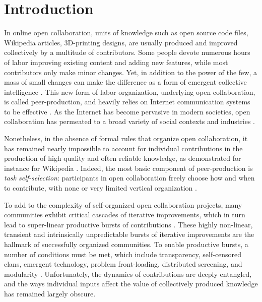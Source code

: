 \section{Introduction}
In online open collaboration, units of knowledge such as open source code files, Wikipedia articles,  3D-printing designs, are usually produced and improved collectively by a multitude of contributors. Some people devote numerous hours of labor improving existing content and adding new features, while most contributors only make minor changes. Yet, in addition to the power of the few, a mass of small changes can make the difference as a form of emergent collective intelligence \cite{kittur2007power}.  This new form of labor organization, underlying open collaboration, is called peer-production, and heavily relies on Internet communication systems to be effective \cite{benkler2002}. As the Internet has become pervasive in modern societies, open collaboration has permeated to a broad variety of social contexts and industries \cite{benkler2011leviathan}. 

Nonetheless, in the absence of formal rules that organize open collaboration, it has remained nearly impossible to account for individual contributions in the production of high quality and often reliable knowledge, as demonstrated for instance for Wikipedia \cite{giles2005internet}. Indeed, the most basic component of peer-production is {\it task self-selection}: participants in open collaboration freely choose how and when to contribute, with none or very limited vertical organization \cite{benkler2002}.

To add to the complexity of self-organized open collaboration projects, many communities exhibit critical cascades of iterative improvements, which in turn lead to super-linear productive bursts of contributions \cite{sornette2014howmuch}. These highly non-linear, transient and intrinsically unpredictable bursts of iterative improvements are the hallmark of successfully organized communities. To enable productive bursts, a number of conditions must be met, which include transparency, self-censored clans, emergent technology, problem front-loading, distributed screening, and modularity \cite{vonkrogh2014designing}. Unfortunately, the dynamics of contributions are deeply entangled, and the ways individual inputs affect the value of collectively produced knowledge has remained largely obscure. 

